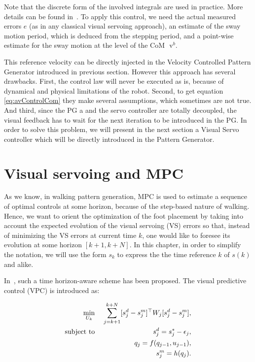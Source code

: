 Note that the discrete form of the involved integrals are used in practice. More details can be found in~\citep{DuneIROS2010}. To apply this control, we need the actual measured errors $ e$ (as in any classical visual servoing approach), an estimate of the sway motion period, which is deduced from the stepping period, and a point-wise estimate for the sway motion at the level of the CoM $\text{ v}^b$.

This reference velocity can be directly injected in the Velocity Controlled Pattern Generator introduced in previous section. However this approach has several drawbacks. First, the control law will never be executed as is, because of dynamical and physical limitations of the robot. Second, to get equation \ref{eq:avControlCom} they make several assumptions, which sometimes are not true. And third, since the PG a and the servo controller are totally decoupled, the visual feedback has to wait for the next iteration to be introduced in the PG. In order to solve this problem, we will present in the next section a Visual Servo controller which will be directly introduced in the Pattern Generator.

\section{Visual servoing and MPC}
\label{sec:vsmauricio}

As we know, in walking pattern generation, MPC is used to estimate a sequence of optimal controls at some horizon, because of the step-based nature of walking. Hence, we want to orient the optimization of the foot placement by taking into account the expected evolution of the visual servoing (VS) errors so that, instead of minimizing the VS errors at current time $k$, one would like to foresee its evolution at some horizon $[k+1,k+N]$. In this chapter, in order to simplify the notation, we will use the form $s_k$ to express the the time reference $k$ of $s(k)$ and alike.

In~\citep{Allibert2010}, such a time horizon-aware scheme has been proposed. The visual predictive control (VPC) is introduced as:

\begin{eqnarray}
\label{Eq:MinVisualFeatures}
 \min_{U_{k}} \;&& \sum\limits_{j=k+1}^{k+N} [ s^d_j - s^m_j]^{\top} W_j [s^d_j - s^m_j], \\
 \mbox{subject to} \; && s^d_j = s^{*}_j - \epsilon_j, \\
 \label{Eq:ConstraintDynamicModel}
 && q_j = f(q_{j-1},u_{j-1}), \\
 \label{Eq:ConstraintProjection}
 && s^m_j = h(q_j).
\end{eqnarray}


